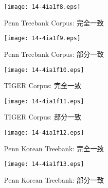 \documentclass[japanese]{jnlp_1.3e}
\begin{document}
\begin{table}[t]

\end{table}

\begin{figure}[b]
\begin{minipage}{0.47\hsize}
\begin{center}
\texttt{[image: 14-4ia1f8.eps]}
\caption{Penn Treebank Corpus: 完全一致}
\label{fig:penn-e}
\end{center}
\end{minipage}
\hfill
\begin{minipage}{0.47\hsize}
\begin{center}
\texttt{[image: 14-4ia1f9.eps]}
      \caption{Penn Treebank Corpus: 部分一致}
      \label{fig:penn-p}
\end{center}
\end{minipage}
\end{figure}

\begin{figure}[t]
\begin{minipage}{0.47\hsize}
\begin{center}
\texttt{[image: 14-4ia1f10.eps]}
      \caption{TIGER Corpus: 完全一致}
      \label{fig:tiger-e}
\end{center}
\end{minipage}
\hfill
\begin{minipage}{0.47\hsize}
\begin{center}
\texttt{[image: 14-4ia1f11.eps]}
      \caption{TIGER Corpus: 部分一致}
      \label{fig:tiger-p}
\end{center}
\end{minipage}
\end{figure}


\begin{figure}[t]
\begin{minipage}{0.47\hsize}
\begin{center}
\texttt{[image: 14-4ia1f12.eps]}
      \caption{Penn Korean Treebank: 完全一致}
      \label{fig:korean-e}
\end{center}
\end{minipage}
\hfill
\begin{minipage}{0.47\hsize}
\begin{center}
\texttt{[image: 14-4ia1f13.eps]}
      \caption{Penn Korean Treebank: 部分一致}
      \label{fig:korean-p}
\end{center}
\end{minipage}
\end{figure}
\end{document}
